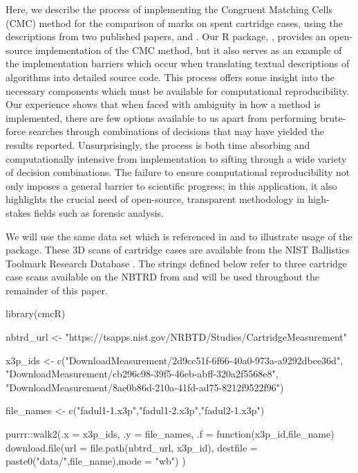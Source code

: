 Here, we describe the process of implementing the Congruent Matching
Cells (CMC) method for the comparison of marks on spent cartridge cases,
using the descriptions from two published papers, \citet{song_3d_2014}
and \citet{tong_improved_2015}. Our R package, , provides
an open-source implementation of the CMC method, but it also serves as
an example of the implementation barriers which occur when translating
textual descriptions of algorithms into detailed source code. This
process offers some insight into the necessary components which must be
available for computational reproducibility. Our experience shows that
when faced with ambiguity in how a method is implemented, there are few
options available to us apart from performing brute-force searches
through combinations of decisions that may have yielded the results
reported. Unsurprisingly, the process is both time absorbing and
computationally intensive from implementation to sifting through a wide
variety of decision combinations. The failure to ensure computational
reproducibility not only imposes a general barrier to scientific
progress; in this application, it also highlights the crucial need of
open-source, transparent methodology in high-stakes fields such as
forensic analysis.

We will use the same data set which is referenced in
\citet{song_3d_2014} and \citet{tong_improved_2015} to illustrate usage
of the  package. These 3D scans of cartridge cases are
available from the NIST Ballistics Toolmark Research Database
\citep[NBTRD;][]{nbtrd}. The strings defined below refer to three
cartridge case scans available on the NBTRD from
\citet{fadul_empirical_2011} and will be used throughout the remainder
of this paper.

\begin{Schunk}
\begin{Sinput}
library(cmcR)

nbtrd_url <- "https://tsapps.nist.gov/NRBTD/Studies/CartridgeMeasurement"

x3p_ids <- c("DownloadMeasurement/2d9cc51f-6f66-40a0-973a-a9292dbee36d",
             "DownloadMeasurement/cb296c98-39f5-46eb-abff-320a2f5568e8",
             "DownloadMeasurement/8ae0b86d-210a-41fd-ad75-8212f9522f96")

file_names <- c("fadul1-1.x3p","fadul1-2.x3p","fadul2-1.x3p")

purrr::walk2(.x = x3p_ids,
             .y = file_names,
             .f = function(x3p_id,file_name){
               download.file(url = file.path(nbtrd_url, x3p_id),
                             destfile = paste0("data/",file_name),mode = "wb")
             })
\end{Sinput}
\end{Schunk}

